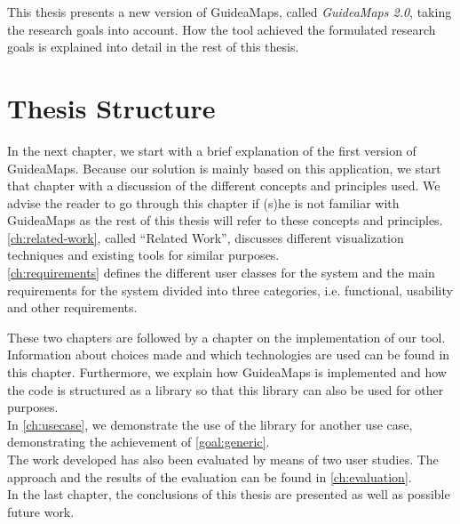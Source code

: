 This thesis presents a new version of GuideaMaps, called \textit{GuideaMaps 2.0}, taking the research goals into account. How the tool achieved the formulated research goals is explained into detail in the rest of this thesis.




\section{Thesis Structure}\label{sec:thesis-structure}
In the next chapter, we start with a brief explanation of the first version of GuideaMaps. Because our solution is mainly based on this application, we start that chapter with a discussion of the different concepts and principles used. We advise the reader to go through this chapter if (s)he is not familiar with GuideaMaps as the rest of this thesis will refer to these concepts and principles.\\

\renewcommand{\chapterautorefname}{Chapter}
\autoref{ch:related-work}, called ``Related Work'', discusses different visualization techniques and existing tools for similar purposes.\\

\autoref{ch:requirements} defines the different user classes for the system and the main requirements for the system divided into three categories, i.e. functional, usability and other requirements.\\
\renewcommand{\chapterautorefname}{chapter}

These two chapters are followed by a chapter on the implementation of our tool. Information about choices made and which technologies are used can be found in this chapter. Furthermore, we explain how GuideaMaps is implemented and how the code is structured as a library so that this library can also be used for other purposes.\\ 

In \autoref{ch:usecase}, we demonstrate the use of the library for another use case, demonstrating the achievement of \ref{goal:generic}.\\

The work developed has also been evaluated by means of two user studies. The approach and the results of the evaluation can be found in \autoref{ch:evaluation}.\\

In the last chapter, the conclusions of this thesis are presented as well as possible future work.



